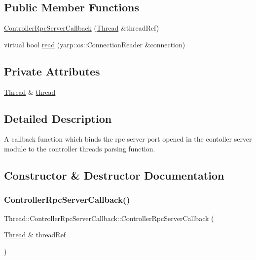 \subsection*{Public Member Functions}
\begin{DoxyCompactItemize}
\item 
\hyperlink{classThread_1_1ControllerRpcServerCallback_ad836e4cdaafc42ad309b5248ef38c280}{Controller\+Rpc\+Server\+Callback} (\hyperlink{classThread}{Thread} \&thread\+Ref)
\item 
virtual bool \hyperlink{classThread_1_1ControllerRpcServerCallback_a61f5510543f1bb96793dceca13eb6865}{read} (yarp\+::os\+::\+Connection\+Reader \&connection)
\end{DoxyCompactItemize}
\subsection*{Private Attributes}
\begin{DoxyCompactItemize}
\item 
\hyperlink{classThread}{Thread} \& \hyperlink{classThread_1_1ControllerRpcServerCallback_a466f100742fdac49e0016ec2f0c43536}{thread}
\end{DoxyCompactItemize}


\subsection{Detailed Description}
A callback function which binds the rpc server port opened in the contoller server module to the controller thread\textquotesingle{}s parsing function. 

\subsection{Constructor \& Destructor Documentation}
\hypertarget{classThread_1_1ControllerRpcServerCallback_ad836e4cdaafc42ad309b5248ef38c280}{}\label{classThread_1_1ControllerRpcServerCallback_ad836e4cdaafc42ad309b5248ef38c280} 
\subsubsection{\texorpdfstring{Controller\+Rpc\+Server\+Callback()}{ControllerRpcServerCallback()}}
{\footnotesize\ttfamily Thread\+::\+Controller\+Rpc\+Server\+Callback\+::\+Controller\+Rpc\+Server\+Callback (\begin{DoxyParamCaption}\item[{\hyperlink{classThread}{Thread} \&}]{thread\+Ref }\end{DoxyParamCaption})}

